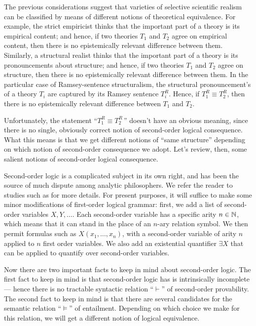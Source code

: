 The previous considerations suggest that varieties of selective
scientific realism can be classified by means of different notions of
theoretical equivalence.  For example, the strict empiricist thinks
that the important part of a theory is its empirical content; and
hence, if two theories $T_1$ and $T_2$ agree on empirical content,
then there is no epistemically relevant difference between them.
Similarly, a structural realist thinks that the important part of a
theory is its pronouncements about structure; and hence, if two
theories $T_1$ and $T_2$ agree on structure, then there is no
epistemically relevant difference between them.  In the particular
case of Ramsey-sentence structuralism, the structural pronouncement's
of a theory $T_i$ are captured by its Ramsey sentence $T_i^R$.  Hence,
if $T_1^R\equiv T_2^R$, then there is no epistemically relevant
difference between $T_1$ and $T_2$.

Unfortunately, the statement ``$T_1^R\equiv T_2^R\,$'' doesn't have an
obvious meaning, since there is no single, obviously correct notion of
second-order logical consequence.  What this means is that we get
different notions of ``same structure'' depending on which notion of
second-order consequence we adopt.  Let's review, then, some salient
notions of second-order logical consequence.

Second-order logic is a complicated subject in its own right, and has
been the source of much dispute among analytic philosophers.  We refer
the reader to studies such as \citep{shapiro,bueno} for more details.
For present purposes, it will suffice to make some minor modifications
of first-order logical grammar: first, we add a list of second-order
variables $X,Y,\dots $.  Each second-order variable has a specific
arity $n\in\mathbb N$, which means that it can stand in the place of an
$n$-ary relation symbol.  We then permit formulas such as
$X(x_1,\dots ,x_n)$, with a second-order variable of arity $n$ applied
to $n$ first order variables.  We also add an existential quantifier
$\exists X$ that can be applied to quantify over second-order
variables.

Now there are two important facts to keep in mind about second-order
logic.  The first fact to keep in mind is that second-order logic has
is intrinsically incomplete --- hence there is no tractable syntactic
relation ``$\vdash$'' of second-order provability.  The second fact to
keep in mind is that there are several candidates for the semantic
relation ``$\vDash$'' of entailment.  Depending on which choice we
make for this relation, we will get a different notion of logical
equivalence.


